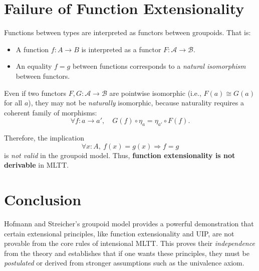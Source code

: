 \documentclass{article}
\begin{document}
\section*{Failure of Function Extensionality}

Functions between types are interpreted as functors between groupoids. That is:
\begin{itemize}
  \item A function $f : A \to B$ is interpreted as a functor $F : \mathcal{A} \to \mathcal{B}$.
  \item An equality $f = g$ between functions corresponds to a \emph{natural isomorphism} between functors.
\end{itemize}

Even if two functors $F, G : \mathcal{A} \to \mathcal{B}$ are pointwise isomorphic (i.e., $F(a) \cong G(a)$ for all $a$), they may not be \emph{naturally} isomorphic, because naturality requires a coherent family of morphisms:
\[
  \forall f : a \to a', \quad G(f) \circ \eta_a = \eta_{a'} \circ F(f).
\]

Therefore, the implication
\[
  \forall x : A,\ f(x) = g(x) \Rightarrow f = g
\]
is \emph{not valid} in the groupoid model. Thus, \textbf{function extensionality is not derivable} in MLTT.

\section*{Conclusion}

Hofmann and Streicher's groupoid model provides a powerful demonstration that certain extensional principles, like function extensionality and UIP, are not provable from the core rules of intensional MLTT. This proves their \emph{independence} from the theory and establishes that if one wants these principles, they must be \emph{postulated} or derived from stronger assumptions such as the univalence axiom.
\end{document}
